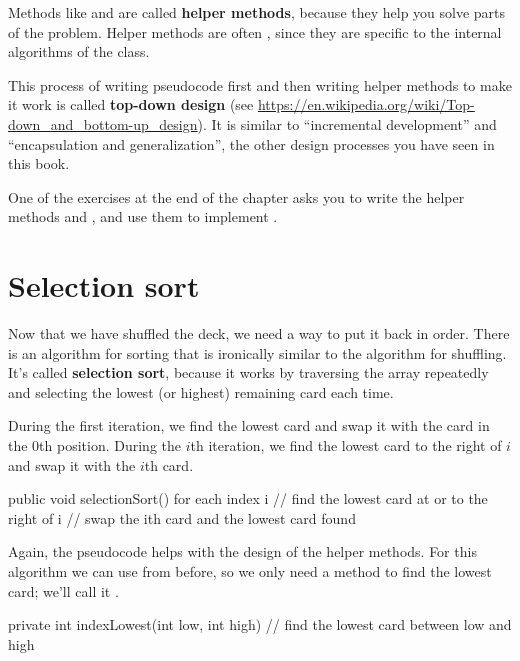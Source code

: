 
Methods like  and  are called {\bf helper methods}, because they help you solve parts of the problem.
Helper methods are often , since they are specific to the internal algorithms of the class.


This process of writing pseudocode first and then writing helper methods to make it work is called {\bf top-down design} (see \url{https://en.wikipedia.org/wiki/Top-down_and_bottom-up_design}).
It is similar to ``incremental development'' and ``encapsulation and generalization'', the other design processes you have seen in this book.

One of the exercises at the end of the chapter asks you to write the helper methods  and , and use them to implement .


\section{Selection sort}
\label{sorting}


Now that we have shuffled the deck, we need a way to put it back in order.
There is an algorithm for sorting that is ironically similar to the algorithm for shuffling.
It's called {\bf selection sort}, because it works by traversing the array repeatedly and selecting the lowest (or highest) remaining card each time.

During the first iteration, we find the lowest card and swap it with the card in the 0th position.
During the $i$th iteration, we find the lowest card to the right of $i$ and swap it with the $i$th card.

\begin{code}
public void selectionSort() {
    for each index i {
        // find the lowest card at or to the right of i
        // swap the ith card and the lowest card found
    }
}
\end{code}

Again, the pseudocode helps with the design of the helper methods.
For this algorithm we can use  from before, so we only need a method to find the lowest card; we'll call it .

\begin{code}
private int indexLowest(int low, int high) {
    // find the lowest card between low and high
}
\end{code}


